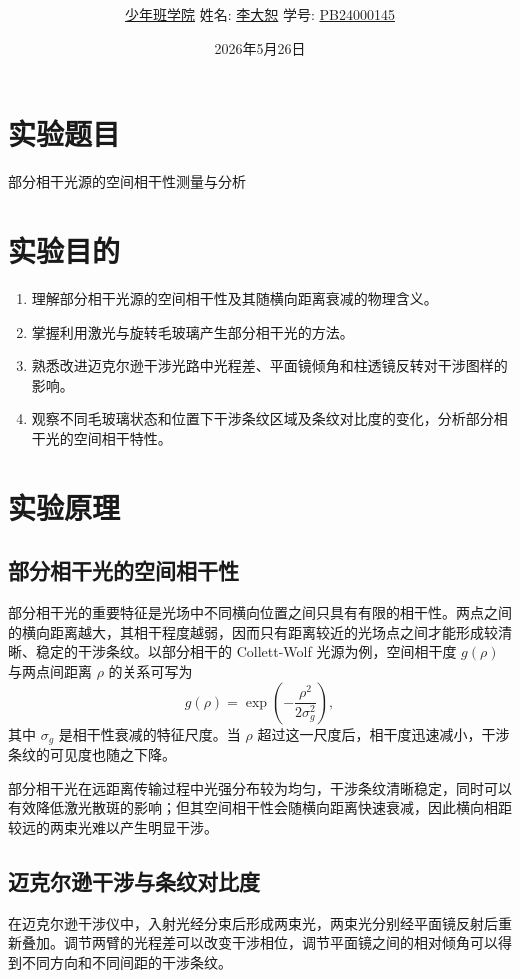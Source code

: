 \documentclass[12pt,a4paper]{article}
\title{\Huge{\textbf{\uuline{实\ 验\ 报\ 告}}}}
\author{\uline{少年班学院} \quad 姓名: \uline{李大恕} \quad 学号: \uline{PB24000145}}
\date{2026年5月26日}
\begin{document}
\maketitle

\section{实验题目}
部分相干光源的空间相干性测量与分析

\section{实验目的}
\begin{enumerate}
    \item 理解部分相干光源的空间相干性及其随横向距离衰减的物理含义。
    \item 掌握利用激光与旋转毛玻璃产生部分相干光的方法。
    \item 熟悉改进迈克尔逊干涉光路中光程差、平面镜倾角和柱透镜反转对干涉图样的影响。
    \item 观察不同毛玻璃状态和位置下干涉条纹区域及条纹对比度的变化，分析部分相干光的空间相干特性。
\end{enumerate}

\section{实验原理}
\subsection{部分相干光的空间相干性}
部分相干光的重要特征是光场中不同横向位置之间只具有有限的相干性。两点之间的横向距离越大，其相干程度越弱，因而只有距离较近的光场点之间才能形成较清晰、稳定的干涉条纹。以部分相干的 Collett-Wolf 光源为例，空间相干度 $g(\rho)$ 与两点间距离 $\rho$ 的关系可写为
\begin{equation}
    g(\rho)=\exp\left(-\frac{\rho^2}{2\sigma_g^2}\right),
    \label{eq:coherence}
\end{equation}
其中 $\sigma_g$ 是相干性衰减的特征尺度。当 $\rho$ 超过这一尺度后，相干度迅速减小，干涉条纹的可见度也随之下降。

部分相干光在远距离传输过程中光强分布较为均匀，干涉条纹清晰稳定，同时可以有效降低激光散斑的影响；但其空间相干性会随横向距离快速衰减，因此横向相距较远的两束光难以产生明显干涉。

\subsection{迈克尔逊干涉与条纹对比度}
在迈克尔逊干涉仪中，入射光经分束后形成两束光，两束光分别经平面镜反射后重新叠加。调节两臂的光程差可以改变干涉相位，调节平面镜之间的相对倾角可以得到不同方向和不同间距的干涉条纹。
\end{document}
